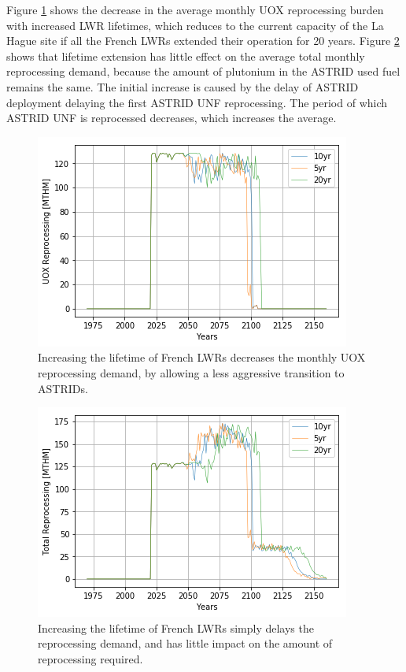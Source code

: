 Figure \ref{fig:ext_uox} shows the decrease in the average monthly
\gls{UOX} reprocessing burden with increased \gls{LWR} lifetimes,
which reduces to the current capacity of the La Hague site if all the
French \glspl{LWR} extended their operation for 20 years.
Figure \ref{fig:ext_all} shows that lifetime extension has little
effect on the average total monthly reprocessing demand, because
the amount of plutonium in the \gls{ASTRID} used fuel remains the same.
The initial increase is caused by the delay of \gls{ASTRID} deployment
delaying the first \gls{ASTRID} \gls{UNF} reprocessing. The period of which
\gls{ASTRID} \gls{UNF} is reprocessed decreases, which increases
the average.

\begin{figure}[htbp!]
    \begin{center}
        \includegraphics[scale=0.6]{./images/sensitivity/ext_uox_rep.png}
    \end{center}
    \caption{Increasing the lifetime of French \glspl{LWR} decreases the monthly
             \gls{UOX} reprocessing demand, by allowing a less aggressive transition
             to \glspl{ASTRID}.}
    \label{fig:ext_uox}
\end{figure}


\begin{figure}[htbp!]
    \begin{center}
        \includegraphics[scale=0.6]{./images/sensitivity/ext_tot_rep.png}
    \end{center}
    \caption{Increasing the lifetime of French \glspl{LWR} simply delays the
             reprocessing demand, and has little impact on the amount of reprocessing
             required.}
    \label{fig:ext_all}
\end{figure}


